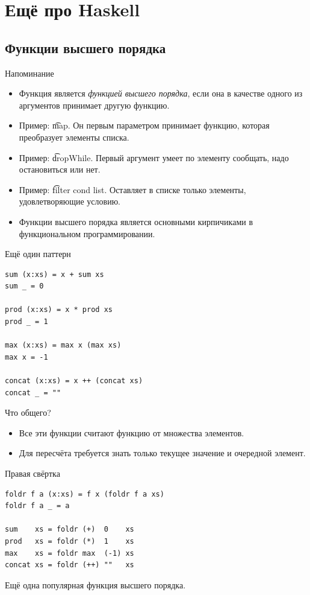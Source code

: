 \section{Ещё про Haskell}
\subsection{Функции высшего порядка}

\begin{frame}
\end{frame}

\begin{frame}{Напоминание}
	\begin{itemize}
		\item Функция является \textit{функцией высшего порядка}, если она в качестве одного из аргументов принимает другую функцию.
		\item Пример: \t{map}. Он первым параметром принимает функцию, которая преобразует элементы списка.
		\item Пример: \t{dropWhile}. Первый аргумент умеет по элементу сообщать, надо остановиться или нет.
		\item Пример: \t{filter cond list}. Оставляет в списке только элементы, удовлетворяющие условию.
		\item Функции высшего порядка является основными кирпичиками в функциональном программировании.
	\end{itemize}
\end{frame}

\begin{frame}[fragile]{Ещё один паттерн}
\begin{verbatim}
sum (x:xs) = x + sum xs
sum _ = 0

prod (x:xs) = x * prod xs
prod _ = 1

max (x:xs) = max x (max xs)
max x = -1

concat (x:xs) = x ++ (concat xs)
concat _ = ""
\end{verbatim}
	Что общего?
	\pause
	\begin{itemize}
		\item Все эти функции считают функцию от множества элементов.
		\item Для пересчёта требуется знать только текущее значение и очередной элемент.
	\end{itemize}
\end{frame}

\begin{frame}[t,fragile]{Правая свёртка}
\begin{verbatim}
foldr f a (x:xs) = f x (foldr f a xs)
foldr f a _ = a

sum    xs = foldr (+)  0    xs
prod   xs = foldr (*)  1    xs
max    xs = foldr max  (-1) xs
concat xs = foldr (++) ""   xs
\end{verbatim}
	Ещё одна популярная функция высшего порядка.
\end{frame}

